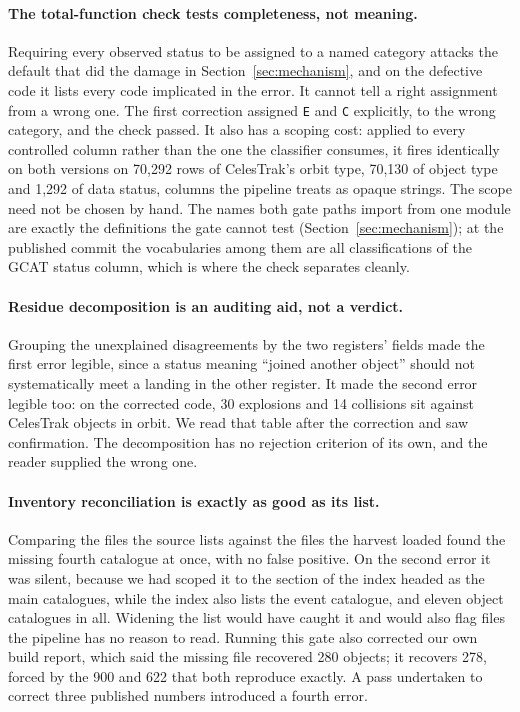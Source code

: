 \paragraph{The total-function check tests completeness, not meaning.}
Requiring every observed status to be assigned to a named category attacks the
default that did the damage in Section~\ref{sec:mechanism}, and on the defective
code it lists every code implicated in the error. It cannot tell a right
assignment from a wrong one. The first correction assigned \texttt{E} and
\texttt{C} explicitly, to the wrong category, and the check passed. It also has a
scoping cost: applied to every controlled column rather than the one the
classifier consumes, it fires identically on both versions on 70,292 rows of
CelesTrak's orbit type, 70,130 of object type and 1,292 of data status, columns
the pipeline treats as opaque strings. The scope need not be chosen by hand. The
names both gate paths import from one module are exactly the definitions the
gate cannot test (Section~\ref{sec:mechanism}); at the published commit the
vocabularies among them are all classifications of the GCAT status column, which
is where the check separates cleanly.

\paragraph{Residue decomposition is an auditing aid, not a verdict.}
Grouping the unexplained disagreements by the two registers' fields made the
first error legible, since a status meaning ``joined another object'' should not
systematically meet a landing in the other register. It made the second error
legible too: on the corrected code, 30 explosions and 14 collisions sit against
CelesTrak objects in orbit. We read that table after the correction and saw
confirmation. The decomposition has no rejection criterion of its own, and the
reader supplied the wrong one.

\paragraph{Inventory reconciliation is exactly as good as its list.}
Comparing the files the source lists against the files the harvest loaded found
the missing fourth catalogue at once, with no false positive. On the second error
it was silent, because we had scoped it to the section of the index headed as
the main catalogues, while the index also lists the event catalogue, and eleven
object catalogues in all. Widening the list would have caught it and would also
flag files the pipeline has no reason to read. Running this gate also corrected
our own build report, which said the missing file recovered 280 objects; it
recovers 278, forced by the 900 and 622 that both reproduce exactly. A pass
undertaken to correct three published numbers introduced a fourth error.

